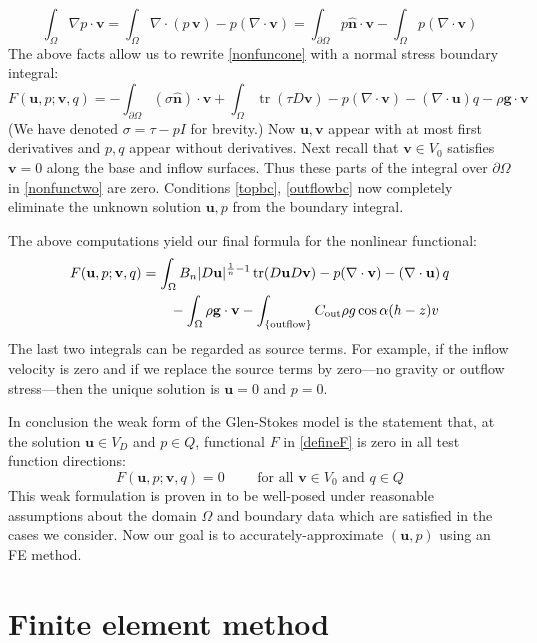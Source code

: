 \documentclass[letterpaper,final,12pt,reqno]{amsart}
\newcommand{\trace}{\operatorname{tr}}
\newcommand{\hbn}{\hat{\mathbf{n}}}
\newcommand{\bu}{\mathbf{u}}
\newcommand{\bv}{\mathbf{v}}
\begin{document}
    $$\int_\Omega \nabla p \cdot \bv = \int_\Omega \nabla\cdot (p\,\bv) - p (\nabla \cdot \bv) = \int_{\partial \Omega} p\hbn \cdot \bv - \int_\Omega p (\nabla \cdot \bv)$$
The above facts allow us to rewrite \eqref{nonfuncone} with a normal stress boundary integral:
\begin{equation}
F(\bu,p;\bv,q) = -\int_{\partial\Omega} (\sigma \hbn)\cdot \bv + \int_\Omega \trace(\tau D\bv) - p (\nabla \cdot \bv) - \left(\nabla \cdot \bu\right) q - \rho \mathbf{g} \cdot \bv \label{nonfunctwo}
\end{equation}
(We have denoted $\sigma=\tau-pI$ for brevity.)  Now $\bu,\bv$ appear with at most first derivatives and $p,q$ appear without derivatives.  Next recall that $\bv\in V_0$ satisfies $\bv=0$ along the base and inflow surfaces.  Thus these parts of the integral over $\partial\Omega$ in \eqref{nonfunctwo} are zero.  Conditions \eqref{topbc}, \eqref{outflowbc} now completely eliminate the unknown solution $\bu,p$ from the boundary integral.

The above computations yield our final formula for the nonlinear functional:
\begin{align}
F(\bu,p;\bv,q) &= \int_\Omega B_n |D\bu|^{\frac{1}{n} - 1} \trace(D\bu D\bv) - p (\nabla \cdot \bv) - \left(\nabla \cdot \bu\right) q \label{defineF} \\
    &\qquad  - \int_\Omega \rho \mathbf{g} \cdot \bv - \int_{\{\text{outflow}\}} C_{\text{out}} \rho g \cos\alpha (h-z) v  \notag
\end{align}
The last two integrals can be regarded as source terms.  For example, if the inflow velocity is zero and if we replace the source terms by zero---no gravity or outflow stress---then the unique solution is $\bu=0$ and $p=0$.

In conclusion the weak form of the Glen-Stokes model is the statement that, at the solution $\bu\in V_D$ and $p\in Q$, functional $F$ in \eqref{defineF} is zero in all test function directions:
\begin{equation}
F(\bu,p;\bv,q) = 0 \qquad \text{ for all } \bv\in V_0 \text{ and } q\in Q  \label{weak}
\end{equation}
This weak formulation is proven in \cite[Theorem 3.8]{JouvetRappaz2011} to be well-posed under reasonable assumptions about the domain $\Omega$ and boundary data which are satisfied in the cases we consider.  Now our goal is to accurately-approximate $(\bu,p)$ using an FE method.


\section{Finite element method} \label{sec:femethod}
\end{document}
